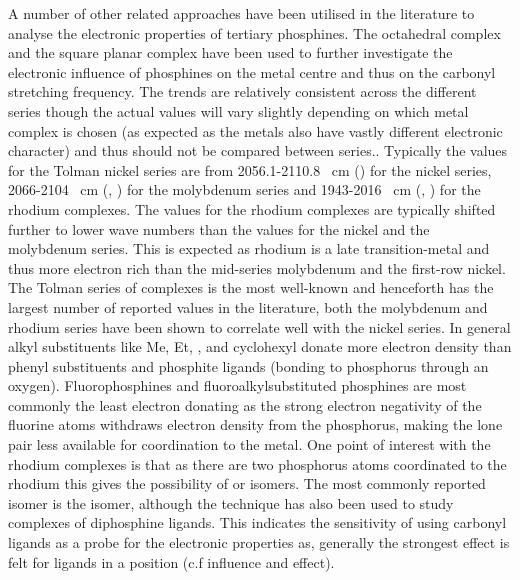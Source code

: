 A number of other related approaches have been utilised in the literature to analyse the electronic properties of tertiary phosphines.  The octahedral \ce{[Mo(CO)5L]} complex and the square planar \ce{Rh(CO)ClL2]} complex have been used to further investigate the electronic influence of phosphines on the metal centre and thus on the carbonyl stretching frequency.  The trends are relatively consistent across the different series though the actual values will vary slightly depending on which metal complex is chosen (as expected as the metals also have vastly different electronic character) and thus should not be compared between series.\cite{Banger2009}.  Typically the values for the Tolman nickel series are from 2056.1-2110.8 \si{\per\cm} () for the nickel series, 2066-2104 \si{\per\cm} (, ) for the molybdenum series and 1943-2016 \si{\per\cm} (, ) for the rhodium complexes.  The values for the rhodium complexes are typically shifted further to lower wave numbers than the values for the nickel and the molybdenum series.  This is expected as rhodium is a late transition-metal and thus more electron rich than the mid-series molybdenum and the first-row nickel.  The Tolman series of \ce{[Ni(CO)3L]} complexes is the most well-known and henceforth has the largest number of reported values in the literature, both the molybdenum and rhodium series have been shown to correlate well with the nickel series.  In general alkyl substituents like Me, Et, , \tBu{} and cyclohexyl donate more electron density than phenyl substituents and phosphite ligands (bonding to phosphorus through an oxygen).  Fluorophosphines and fluoroalkylsubstituted phosphines are most commonly the least electron donating as the strong electron negativity of the fluorine atoms withdraws electron density from the phosphorus, making the lone pair less available for coordination to the metal.  One point of interest with the rhodium complexes is that as there are two phosphorus atoms coordinated to the rhodium this gives the possibility of \cis{} or \trans{} isomers.  The most commonly reported isomer  is the \trans{} isomer, although the technique has also been used to study \cis{} complexes of diphosphine ligands.  This indicates the sensitivity of using carbonyl ligands as a probe for the electronic properties as, generally the strongest effect is felt for ligands in a \trans{} position (c.f \trans{} influence and \trans{} effect).

